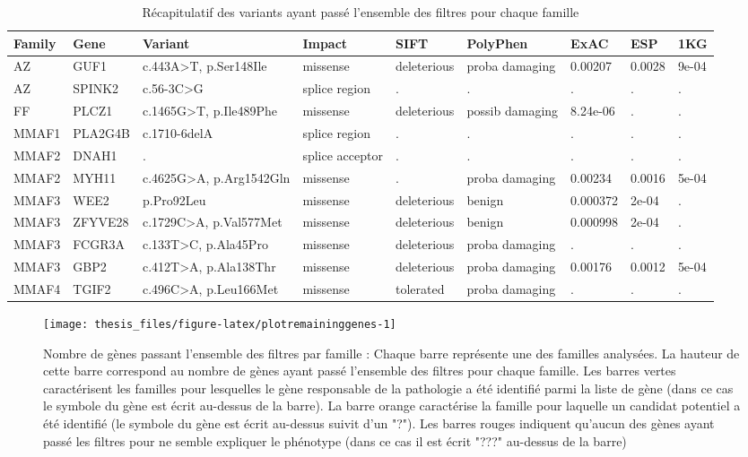 \documentclass[12pt,twoside]{reedthesis}
\theoremstyle{definition}
\theoremstyle{definition}
\theoremstyle{remark}
\begin{document}
  \begin{landscape}
  \begin{longtable}[t]{lllllllll}
  \caption{\label{tab:tablegene}Récapitulatif des variants ayant passé l'ensemble des filtres pour chaque famille}\\
  \toprule
  Family & Gene & Variant & Impact & SIFT & PolyPhen & ExAC & ESP & 1KG\\
  \midrule
  AZ & GUF1 & c.443A>T, p.Ser148Ile & missense & deleterious & proba damaging & 0.00207 & 0.0028 & 9e-04\\
  AZ & SPINK2 & c.56-3C>G & splice region & . & . & . & . & .\\
  FF & PLCZ1 & c.1465G>T, p.Ile489Phe & missense & deleterious & possib damaging & 8.24e-06 & . & .\\
  MMAF1 & PLA2G4B & c.1710-6delA & splice region & . & . & . & . & .\\
  MMAF2 & DNAH1 & . & splice acceptor & . & . & . & . & .\\
  \addlinespace
  MMAF2 & MYH11 & c.4625G>A, p.Arg1542Gln & missense & . & proba damaging & 0.00234 & 0.0016 & 5e-04\\
  MMAF3 & WEE2 & p.Pro92Leu & missense & deleterious & benign & 0.000372 & 2e-04 & .\\
  MMAF3 & ZFYVE28 & c.1729C>A, p.Val577Met & missense & deleterious & benign & 0.000998 & 2e-04 & .\\
  MMAF3 & FCGR3A & c.133T>C, p.Ala45Pro & missense & deleterious & proba damaging & . & . & .\\
  MMAF3 & GBP2 & c.412T>A, p.Ala138Thr & missense & deleterious & proba damaging & 0.00176 & 0.0012 & 5e-04\\
  MMAF4 & TGIF2 & c.496C>A, p.Leu166Met & missense & tolerated & proba damaging & . & . & .\\
  \bottomrule
  \end{longtable}
  \end{landscape}
  
  \newpage
  
  \begin{figure}
  
  {\centering \texttt{[image: thesis\_files/figure-latex/plotremaininggenes-1]} 
  
  }
  
  \caption[Nombre de gènes passant l'ensemble des filtres par famille]{Nombre de gènes passant l'ensemble des filtres par famille  :  Chaque barre représente une des familles analysées. La hauteur de cette barre correspond au nombre de gènes ayant passé l'ensemble des filtres pour chaque famille. Les barres vertes caractérisent les familles pour lesquelles le gène responsable de la pathologie a été identifié parmi la liste de gène (dans ce cas le symbole du gène est écrit au-dessus de la barre). La barre orange caractérise la famille pour laquelle un candidat potentiel a été identifié (le symbole du gène est écrit au-dessus suivit d'un "?"). Les barres rouges indiquent qu'aucun des gènes ayant passé les filtres pour ne semble expliquer le phénotype (dans ce cas il est écrit "???" au-dessus de la barre)}\label{fig:plotremaininggenes}
  \end{figure}
  
\end{document}
